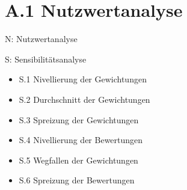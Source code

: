 \section*{A.1 Nutzwertanalyse}
N: Nutzwertanalyse

S: Sensibilitätsanalyse
\begin{itemize}
    \item S.1 Nivellierung der Gewichtungen
    \item S.2 Durchschnitt der Gewichtungen
    \item S.3 Spreizung der Gewichtungen
    \item S.4 Nivellierung der Bewertungen
    \item S.5 Wegfallen der Gewichtungen
    \item S.6 Spreizung der Bewertungen
\end{itemize}
